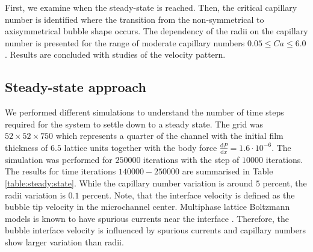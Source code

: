 \documentclass[preprint,12pt]{elsarticle}
\begin{document}
First, we examine when the steady-state is
reached. Then, the critical capillary number is identified where the transition from the
non-symmetrical to axisymmetrical bubble shape occurs. The dependency of the radii on the capillary
number is presented for the range of moderate capillary numbers $0.05 \leq Ca \leq 6.0$. Results are
concluded with studies of the velocity pattern.

\subsection{Steady-state approach}
\label{sec:steady:state}
We performed different simulations to understand the number of time steps required for the
system to
settle down to a steady state. The grid  was $52 \times 52 \times 750$ which represents
a quarter of the channel with the initial film thickness of $6.5$ lattice units together
with the body force $\frac{\mathrm{d}P}{\mathrm{d}x}=1.6
\cdot 10^{-6}$. The simulation was performed for $250000$ iterations with the step of
$10000$ iterations. The results for time iterations $140000-250000$ are summarised in Table
\ref{table:steady:state}. While the
capillary number variation is around $5$ percent, the radii variation is $0.1$ percent. Note, that
the interface velocity is defined as the bubble tip velocity in the microchannel center. Multiphase
lattice Boltzmann models is known to have spurious currents near the interface
\cite{pooley-spurious,shan-spurious}. Therefore, the bubble interface velocity is influenced by
spurious currents and capillary numbers show larger variation than radii. 
\end{document}
